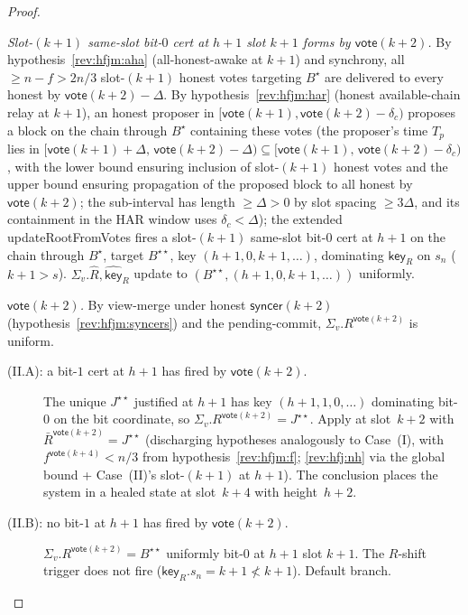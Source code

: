 \documentclass{article}
\newcommand{\key}{\mathsf{key}}
\newcommand{\syncer}{\mathsf{syncer}}
\newcommand{\vote}{\mathsf{vote}}
\newcommand{\comm}[1]{\bar{#1}}
\newcommand{\updateRootFromVotes}{\textsf{updateRootFromVotes}\xspace}
\theoremstyle{plain}
\theoremstyle{definition}
\theoremstyle{remark}
\newcommand{\HAR}{honest available-chain relay\xspace}
\newcommand{\AHA}{all-honest-awake\xspace}
\begin{document}
\begin{proof}
\begin{description}
\emph{Slot-$(k+1)$ same-slot bit-$0$ cert at $h+1$ slot $k+1$ forms by $\vote(k+2)$.}
By hypothesis~\ref{rev:hfjm:aha} (\AHA at $k+1$) and synchrony, all $\geq n - f > 2n/3$ slot-$(k+1)$ honest votes targeting $B^\star$ are delivered to every honest by $\vote(k+2) - \Delta$. By hypothesis~\ref{rev:hfjm:har} (\HAR at $k+1$), an honest proposer in $[\vote(k+1), \vote(k+2) - \delta_c)$ proposes a block on the chain through $B^\star$ containing these votes (the proposer's time $T_p$ lies in $[\vote(k+1) + \Delta,\, \vote(k+2) - \Delta) \subseteq [\vote(k+1),\, \vote(k+2) - \delta_c)$, with the lower bound ensuring inclusion of slot-$(k+1)$ honest votes and the upper bound ensuring propagation of the proposed block to all honest by $\vote(k+2)$; the sub-interval has length $\geq \Delta > 0$ by slot spacing $\geq 3\Delta$, and its containment in the HAR window uses $\delta_c < \Delta$); the extended \updateRootFromVotes{} fires a slot-$(k+1)$ same-slot bit-$0$ cert at $h+1$ on the chain through $B^\star$, target $B^{\star\star}$, key $(h+1, 0, k+1, \ldots)$, dominating $\key_R$ on $s_n$ ($k+1 > s$). $\Sigma_v.\hat{R}, \hat{\key}_R$ update to $(B^{\star\star}, (h+1, 0, k+1, \ldots))$ uniformly.

\emph{$\vote(k+2)$.}
By view-merge under honest $\syncer(k+2)$ (hypothesis~\ref{rev:hfjm:syncers}) and the pending-commit, $\Sigma_v.R^{\vote(k+2)}$ is uniform.

\begin{description}
\item[{(II.A): a bit-$1$ cert at $h+1$ has fired by $\vote(k+2)$.}]\hfill

The unique $J^{\star\star}$ justified at $h+1$ has key $(h+1, 1, 0, \ldots)$ dominating bit-$0$ on the bit coordinate, so $\Sigma_v.R^{\vote(k+2)} = J^{\star\star}$. Apply  at slot~$k+2$ with $\comm{R}^{\vote(k+2)} = J^{\star\star}$ (discharging hypotheses analogously to Case~(I), with $f^{\vote(k+4)} < n/3$ from hypothesis~\ref{rev:hfjm:f}; \ref{rev:hfj:nh} via the global bound + Case~(II)'s slot-$(k+1)$ at $h+1$). The conclusion places the system in a healed state at slot~$k+4$ with height~$h+2$.

\item[{(II.B): no bit-$1$ at $h+1$ has fired by $\vote(k+2)$.}]\hfill

$\Sigma_v.R^{\vote(k+2)} = B^{\star\star}$ uniformly bit-$0$ at $h+1$ slot $k+1$. The $R$-shift trigger does not fire ($\key_R.s_n = k+1 \not< k+1$). Default branch.


\end{description}
\end{description}
\end{proof}
\end{document}
